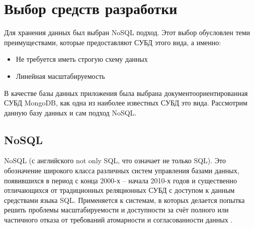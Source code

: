 \documentclass[14pt]{extreport}
\begin{document}
\chapter{Выбор средств разработки}
Для хранения данных был выбран NoSQL подход. Этот выбор обусловлен теми преимуществами, которые предоставляют СУБД этого вида, а именно:
\begin{itemize}
\item Не требуется иметь строгую схему данных
\item Линейная масштабируемость
\end{itemize}

В качестве базы данных приложения была выбрана документоориентированная СУБД MongoDB, как одна из наиболее известных СУБД это вида. Рассмотрим данную базу данных и сам подход NoSQL.


\section{NoSQL}
NoSQL (с английского not only SQL, что означает не только SQL). Это обозначение широкого класса различных систем управления базами данных, появившихся в период с конца 2000-х -- начала 2010-х годов и существенно отличающихся от традиционных реляционных СУБД с доступом к данным средствами языка SQL. Применяется к системам, в которых делается попытка решить проблемы масштабируемости и доступности за счёт полного или частичного отказа от требований атомарности и согласованности данных \cite{nosqlFauler}. 
\end{document}
